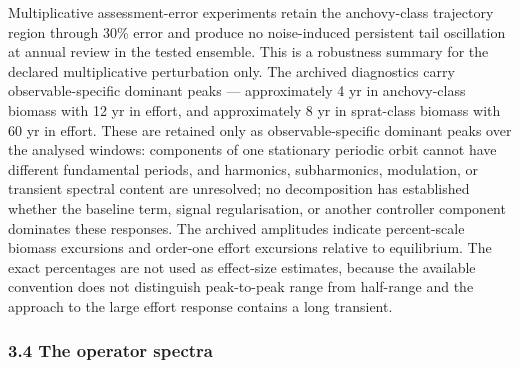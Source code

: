 \documentclass[11pt]{article}
\begin{document}
Multiplicative assessment-error experiments retain the anchovy-class
trajectory region through 30\% error and produce no noise-induced
persistent tail oscillation at annual review in the tested ensemble.
This is a robustness summary for the declared multiplicative
perturbation only. The archived diagnostics carry observable-specific
dominant peaks --- approximately 4 yr in anchovy-class biomass with 12
yr in effort, and approximately 8 yr in sprat-class biomass with 60 yr
in effort. These are retained only as observable-specific dominant peaks
over the analysed windows: components of one stationary periodic orbit
cannot have different fundamental periods, and harmonics, subharmonics,
modulation, or transient spectral content are unresolved; no
decomposition has established whether the baseline term, signal
regularisation, or another controller component dominates these
responses. The archived amplitudes indicate percent-scale biomass
excursions and order-one effort excursions relative to equilibrium. The
exact percentages are not used as effect-size estimates, because the
available convention does not distinguish peak-to-peak range from
half-range and the approach to the large effort response contains a long
transient.

\subsubsection{3.4 The operator spectra}\label{the-operator-spectra}
\end{document}
